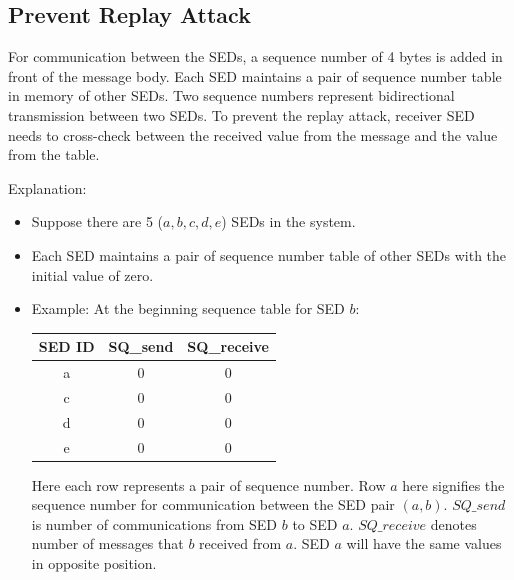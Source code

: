 \documentclass[11pt,oneside,onecolumn,letterpaper]{article}
\begin{document}
  \subsection{Prevent Replay Attack}
  For communication between the SEDs, a sequence number of 4 bytes is added in front of the message body. Each SED maintains a pair of sequence number table in memory of other SEDs. Two sequence numbers represent bidirectional transmission between two SEDs. To prevent the replay attack, receiver SED needs to cross-check between the received value from the message and the value from the table.
 
Explanation:
  \begin{itemize}
  \item Suppose there are 5 ($a, b, c, d, e$) SEDs in the system.
  \item Each SED maintains a pair of sequence number table of other SEDs with the initial value of zero.
  \item  Example: At the beginning sequence table for SED $b$:

    \begin{center}
  \begin{tabular}{ |c|c|c| } 
   \hline
  \textbf{SED ID} & \textbf{SQ\_send} & \textbf{SQ\_receive}\\
 	\hline \hline
 	a & 0 & 0 \\ 
	c & 0 & 0 \\ 
 	d & 0 & 0 \\ 
 	e & 0 & 0 \\ 
	 \hline
\end{tabular}
\end{center}
Here each row represents a pair of sequence number.
Row $a$ here signifies the sequence number for communication between the SED pair $(a,b)$. $SQ\_send$ is number of communications from SED $b$  to SED $a$. $SQ\_receive$ denotes number of messages that $b$ received from $a$. SED $a$ will have the same values in opposite position.


\end{itemize}
\end{document}
